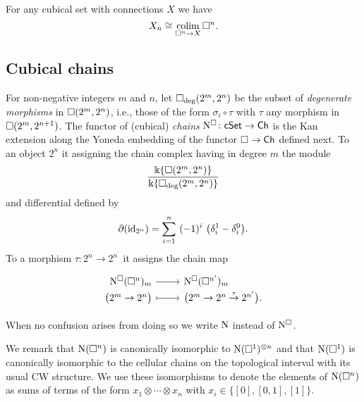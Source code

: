 For any cubical set with connections $X$ we have
\begin{equation*}
X_n \cong \operatorname*{colim}_{\square^n \to X} \square^n.
\end{equation*}

\subsection{Cubical chains}

For non-negative integers $m$ and $n$, let $\square_{\deg}(2^m, 2^n)$ be the subset of \textit{degenerate morphisms} in $\square(2^m, 2^n)$, i.e., those of the form $\sigma_i \circ \tau$ with $\tau$ any morphism in $\square(2^m, 2^{n+1})$.
The functor of (cubical) \textit{chains} $\operatorname{N^{\square}} \colon \mathsf{cSet} \to \mathsf{Ch}$ is the Kan extension along the Yoneda embedding of the functor $\square \to \mathsf{Ch}$ defined next.
To an object $2^n$ it assigning the chain complex having in degree $m$ the module
\begin{equation*}
\frac{\Bbbk\{\square(2^m, 2^n)\}}{\Bbbk\{\square_{\deg}(2^m, 2^n)\}}
\end{equation*}
and differential defined by
\begin{equation*}
\partial (\id_{2^n}) = \sum_{i=1}^{n} \ (-1)^i \
\big(\delta_i^1 - \delta_i^0 \big).
\end{equation*}
To a morphism $\tau \colon 2^n \to 2^{n^\prime}$ it assigns the chain map
\begin{equation*}
\begin{tikzcd}[row sep=-3pt, column sep=normal,
/tikz/column 1/.append style={anchor=base east},
/tikz/column 2/.append style={anchor=base west}]
\cchains(\cube^n)_m \arrow[r] &  \cchains(\cube^{n^\prime})_m \\
\big( 2^m \to 2^n \big) \arrow[r, mapsto] & \big( 2^m \to 2^n \stackrel{\tau}{\to} 2^{n^\prime} \big).
\end{tikzcd}
\end{equation*}

When no confusion arises from doing so we write $\operatorname{N}$ instead of $\operatorname{N^{\square}}$.

We remark that $\operatorname{N}(\square^n)$ is canonically isomorphic to $\operatorname{N}(\square^1)^{\otimes n}$ and that $\operatorname{N}(\square^1)$ is canonically isomorphic to the cellular chains on the topological interval with its usual CW structure.
We use these isomorphisms to denote the elements of $\operatorname{N}(\square^n)$ as sums of terms of the form $x_1 \otimes \cdots \otimes x_n$ with $x_i \in \big\{[0], [0,1], [1] \big\}$.

